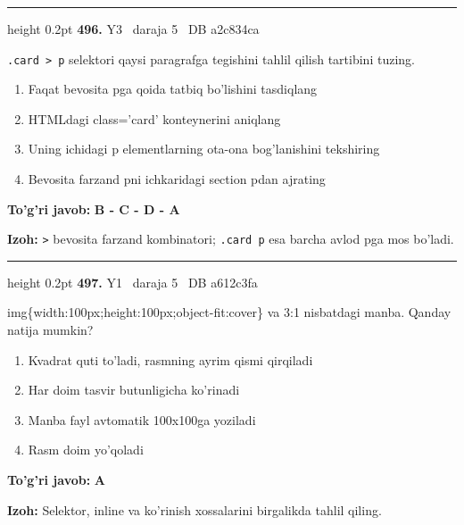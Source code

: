 \documentclass[10pt,a4paper,oneside]{article}
\begin{document}
\vspace{2mm}\hrule height 0.2pt \vspace{4mm}
\hypertarget{q496}{\textbf{\color{ink}496.}}  {\color{muted}\scriptsize Y3 \textbullet\ daraja 5 \textbullet\ DB a2c834ca}
\par
\texttt{.card \textgreater{} p} selektori qaysi paragrafga tegishini tahlil qilish tartibini tuzing.
\begin{enumerate}[label=\Alph*),leftmargin=9mm]
\item Faqat bevosita pga qoida tatbiq bo'lishini tasdiqlang
\item HTMLdagi class='card' konteynerini aniqlang
\item Uning ichidagi p elementlarning ota-ona bog'lanishini tekshiring
\item Bevosita farzand pni ichkaridagi section pdan ajrating
\end{enumerate}
\begin{tcolorbox}[enhanced,breakable,colback=teal!4,colframe=teal!45!black,boxrule=0.45pt,arc=1.2mm,left=2.8mm,right=2.8mm,top=2mm,bottom=2mm,before skip=2mm,after skip=2mm]
\textbf{\color{teal}To'g'ri javob:} \textbf{B - C - D - A}
\par\smallskip
\textbf{Izoh:} \texttt{\textgreater{}} bevosita farzand kombinatori; \texttt{.card p} esa barcha avlod pga mos bo'ladi.
\end{tcolorbox}
\vspace{2mm}\hrule height 0.2pt \vspace{4mm}
\hypertarget{q497}{\textbf{\color{ink}497.}}  {\color{muted}\scriptsize Y1 \textbullet\ daraja 5 \textbullet\ DB a612c3fa}
\par
img\{width:100px;height:100px;object-fit:cover\} va 3:1 nisbatdagi manba. Qanday natija mumkin?
\begin{enumerate}[label=\Alph*),leftmargin=9mm]
\item Kvadrat quti to'ladi, rasmning ayrim qismi qirqiladi
\item Har doim tasvir butunligicha ko'rinadi
\item Manba fayl avtomatik 100x100ga yoziladi
\item Rasm doim yo'qoladi
\end{enumerate}
\begin{tcolorbox}[enhanced,breakable,colback=teal!4,colframe=teal!45!black,boxrule=0.45pt,arc=1.2mm,left=2.8mm,right=2.8mm,top=2mm,bottom=2mm,before skip=2mm,after skip=2mm]
\textbf{\color{teal}To'g'ri javob:} \textbf{A}
\par\smallskip
\textbf{Izoh:} Selektor, inline va ko'rinish xossalarini birgalikda tahlil qiling.
\end{tcolorbox}
\end{document}

